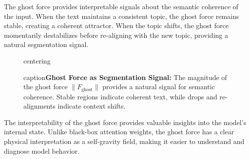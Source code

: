 \documentclass[12pt,a4paper]{article}
\begin{document}
The ghost force provides interpretable signals about the semantic coherence of the input. When the text maintains a consistent topic, the ghost force remains stable, creating a coherent attractor. When the topic shifts, the ghost force momentarily destabilizes before re-aligning with the new topic, providing a natural segmentation signal.

\begin{figure}[htbp]
centering
caption{\textbf{Ghost Force as Segmentation Signal:} The magnitude of 
         the ghost force $\|F_{\text{ghost}}\|$ provides a natural signal 
         for semantic coherence. Stable regions indicate coherent text, 
         while drops and re-alignments indicate context shifts.}
\label{fig:segmentation}
\end{figure}

The interpretability of the ghost force provides valuable insights into the model's internal state. Unlike black-box attention weights, the ghost force has a clear physical interpretation as a self-gravity field, making it easier to understand and diagnose model behavior.
\end{document}
